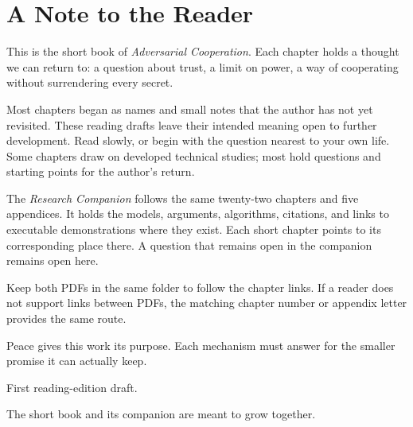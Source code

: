 \raggedright
\chapter*{A Note to the Reader}

This is the short book of \emph{Adversarial Cooperation}. Each chapter holds a
thought we can return to: a question about trust, a limit on power, a way of
cooperating without surrendering every secret.

Most chapters began as names and small notes that the author has not yet
revisited. These reading drafts leave their intended meaning open to further
development. Read slowly, or begin with the question nearest to your own life.
Some chapters draw on developed technical studies; most hold questions and
starting points for the author's return.

The \emph{Research Companion} follows the same twenty-two chapters and five
appendices. It holds the models, arguments, algorithms, citations, and links
to executable demonstrations where they exist. Each short chapter points to
its corresponding place there. A question that remains open in the companion
remains open here.

Keep both PDFs in the same folder to follow the chapter links. If a reader
does not support links between PDFs, the matching chapter number or appendix
letter provides the same route.

Peace gives this work its purpose. Each mechanism must answer for the smaller
promise it can actually keep.

\vfill
{\small\color{quiet}First reading-edition draft.\par
The short book and its companion are meant to grow together.}
